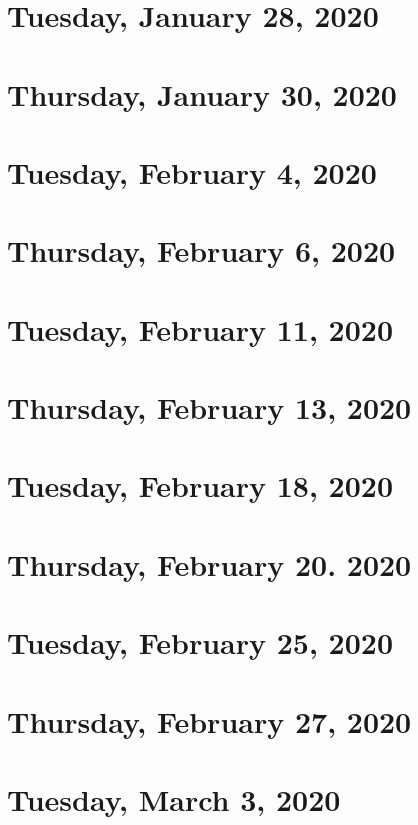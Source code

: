 \documentclass{../mynotes}
\begin{document}
\section{Tuesday, January 28, 2020}
    
\section{Thursday, January 30, 2020}
    

\section{Tuesday, February 4, 2020}
    
\section{Thursday, February 6, 2020}
    
    
\section{Tuesday, February 11, 2020}
    
\section{Thursday, February 13, 2020}
    

\section{Tuesday, February 18, 2020}
    
\section{Thursday, February 20. 2020}
    

\section{Tuesday, February 25, 2020}
    
\section{Thursday, February 27, 2020}
    

\section{Tuesday, March 3, 2020}
    

%     
\end{document}
